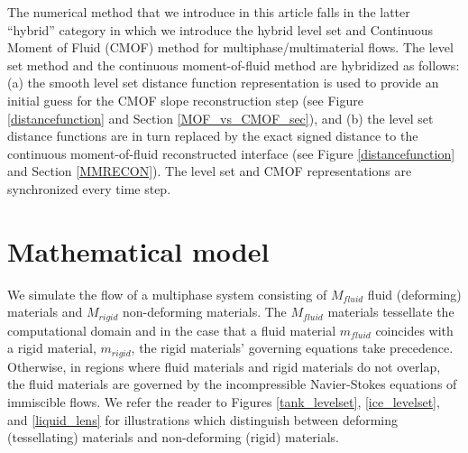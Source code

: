 \documentclass[]{article}
\begin{document}
The numerical method that we introduce in this article falls in the latter
``hybrid'' category in which we introduce the hybrid level set and 
Continuous Moment of Fluid (CMOF) method for multiphase/multimaterial
flows.  The level set method and the continuous moment-of-fluid method
are hybridized as follows:
(a) the smooth level set distance function representation is used
to provide an initial guess for the CMOF slope reconstruction
step (see Figure \ref{distancefunction} and Section \ref{MOF_vs_CMOF_sec}),
and (b) the level set distance functions are in turn replaced by the
exact signed distance to the continuous moment-of-fluid reconstructed
interface (see Figure \ref{distancefunction} and 
Section \ref{MMRECON}).  The level set and CMOF representations are 
synchronized every time step.


\section{Mathematical model}
We simulate the flow of a multiphase system consisting of $M_{fluid}$
fluid (deforming) materials and $M_{rigid}$ non-deforming materials.
The $M_{fluid}$ materials tessellate the computational domain and in the
case that a fluid material $m_{fluid}$ coincides with a rigid material,
$m_{rigid}$, the rigid materials' governing equations take precedence.
Otherwise, in regions where fluid materials and rigid materials do not
overlap, the fluid materials are
governed by the incompressible Navier-Stokes equations of immiscible
flows.   We refer the reader to Figures \ref{tank_levelset},
\ref{ice_levelset}, and \ref{liquid_lens} for illustrations which 
distinguish between deforming (tessellating) materials and non-deforming
(rigid) materials.
\end{document}
